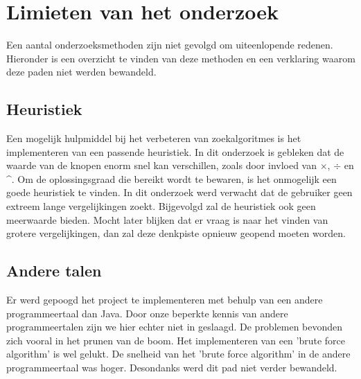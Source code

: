 \documentclass[Main.tex]{subfiles}
\begin{document}
\section{Limieten van het onderzoek}
Een aantal onderzoeksmethoden zijn niet gevolgd om uiteenlopende redenen. Hieronder is een overzicht te vinden van deze methoden en een verklaring waarom deze paden niet werden bewandeld. 

\subsection{Heuristiek}
Een mogelijk hulpmiddel bij het verbeteren van zoekalgoritmes is het implementeren van een passende heuristiek. In dit onderzoek is gebleken dat de waarde van de knopen enorm snel kan verschillen, zoals door invloed van $\times$, $\div$ en \^{}. Om de oplossingsgraad die bereikt wordt te bewaren, is het onmogelijk een goede heuristiek te vinden. In dit onderzoek werd verwacht dat de gebruiker geen extreem lange vergelijkingen zoekt. Bijgevolgd zal de heuristiek ook geen meerwaarde bieden. Mocht later blijken dat er vraag is naar het vinden van grotere vergelijkingen, dan zal deze denkpiste opnieuw geopend moeten worden.

\subsection{Andere talen}
Er werd gepoogd het project te implementeren met behulp van een andere programmeertaal dan Java. Door onze beperkte kennis van andere programmeertalen zijn we hier echter niet in geslaagd. De problemen bevonden zich vooral in het prunen van de boom. Het implementeren van een 'brute force algorithm' is wel gelukt. De snelheid van het 'brute force algorithm' in de andere programmeertaal was hoger. Desondanks werd dit pad niet verder bewandeld.

\end{document}
